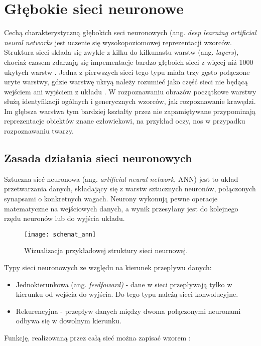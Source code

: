 \section{Głębokie sieci neuronowe}

Cechą charakterystyczną głębokich seci neuronowych (ang. \textit{deep learning artificial neural networks} jest uczenie się wysokopoziomowej reprezentacji wzorców. Struktura sieci składa się zwykle z kilku do kilkunastu warstw (ang. \textit{layers}), chociaż czasem zdarzają się impementacje bardzo głęboich sieci z więcej niż 1000 ukytych warstw \cite{He2015DeepRL}. Jedna z pierwszych sieci tego typu miała trzy gęsto połączone uryte warstwy, gdzie warstwę ukryą należy rozumieć jako część sieci nie będącą wejściem ani wyjściem z układu \cite{Hinton2006AFL}. W rozpoznawaniu obrazów początkowe warstwy służą identyfikacji ogólnych i generycznych wzorców, jak rozpoznawanie krawędzi. Im głębsza warstwa tym bardziej kształty przez nie zapamiętywane przypominają reprezentacje obiektów znane człowiekowi, na przykład oczy, nos w przypadku rozpoznawaniu twarzy.

\subsection{Zasada działania sieci neuronowych}
Sztuczna sieć neuronowa (ang. \textit{artificial neural network}, ANN) jest to układ przetwarzania danych, składający się z warstw sztucznych neuronów, połączonych synapsami o konkretnych wagach. Neurony wykonują pewne operacje matematyczne na wejściowych danych, a wynik przesyłany jest do kolejnego rzędu neuronów lub do wyjścia układu. 

\begin{figure}[h]
	\centering
	\centering
		\texttt{[image: schemat\_ann]}	
	\caption{Wizualizacja przykładowej struktury sieci neurnowej.}
\end{figure}

Typy sieci neuronowych ze względu na kierunek przepływu danych:
\begin{itemize}
\item{Jednokierunkowa (ang. \textit{feedfoward)} - dane w sieci przepływają tylko w kierunku od wejścia do wyjścia. Do tego typu należą sieci konwolucyjne.}
\item{Rekurencyjna - przepływ danych między dwoma połączonymi neuronami odbywa się w dowolnym kierunku.}
\end{itemize}

Funkcję, realizowaną przez całą sieć można zapisać wzorem \cite{tadeusiewicz_sn}:

